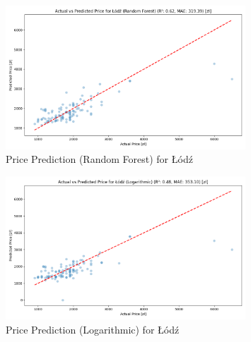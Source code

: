 \begin{figure}[H]
    \centering
    \includegraphics[width=0.8\textwidth]{figures/lodz_price_prediction_rf.png}
    \caption{Price Prediction (Random Forest) for Łódź}
\end{figure}
\begin{figure}[H]
    \centering
    \includegraphics[width=0.8\textwidth]{figures/lodz_price_prediction_logarithmic.png}
    \caption{Price Prediction (Logarithmic) for Łódź}
\end{figure}

